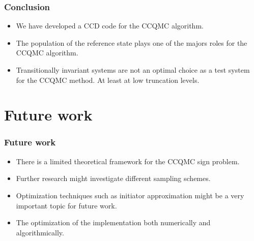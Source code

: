 \documentclass{beamer}
\begin{document}
\begin{frame}
\frametitle{Conclusion}
\begin{itemize}
\item We have developed a CCD code for the CCQMC algorithm.
\item The population of the reference state plays one of the majors roles for the CCQMC algorithm.
\item Transitionally invariant systems are not an optimal choice as a test system for the CCQMC method. At least at low truncation levels.
\end{itemize}
\end{frame}
\section{Future work}
\begin{frame}
\frametitle{Future work}
\begin{itemize}
\item There is a limited theoretical framework for the CCQMC
sign problem.
\item Further research might investigate different sampling schemes.
\item Optimization techniques such as initiator approximation might be a very important topic for future work.
\item The optimization of the implementation both numerically and algorithmically.
\end{itemize}
\end{frame}
\end{document}
